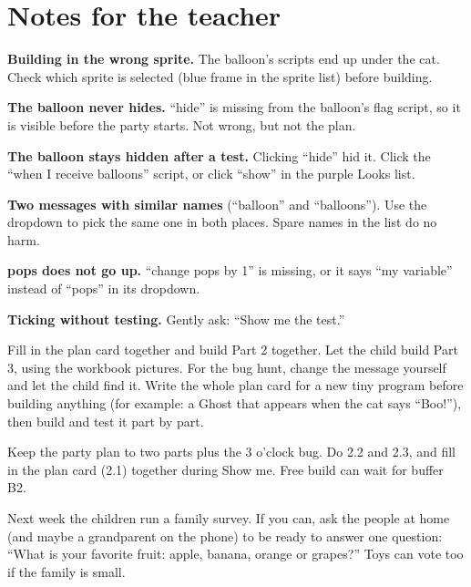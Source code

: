 \section{Notes for the teacher}
\begin{commonmistakes}
  \item \textbf{Building in the wrong sprite.} The balloon's scripts end up under the cat. Check which sprite is selected (blue frame in the sprite list) before building.
  \item \textbf{The balloon never hides.} \enquote{hide} is missing from the balloon's flag script, so it is visible before the party starts. Not wrong, but not the plan.
  \item \textbf{The balloon stays hidden after a test.} Clicking \enquote{hide} hid it. Click the \enquote{when I receive balloons} script, or click \enquote{show} in the purple Looks list.
  \item \textbf{Two messages with similar names} (\enquote{balloon} and \enquote{balloons}). Use the dropdown to pick the same one in both places. Spare names in the list do no harm.
  \item \textbf{pops does not go up.} \enquote{change pops by 1} is missing, or it says \enquote{my variable} instead of \enquote{pops} in its dropdown.
  \item \textbf{Ticking without testing.} Gently ask: \enquote{Show me the test.}
\end{commonmistakes}

\begin{differentiation}
\supportpath Fill in the plan card together and build Part 2 together. Let the child build Part 3, using the workbook pictures. For the bug hunt, change the message yourself and let the child find it.
\extensionpath Write the whole plan card for a new tiny program before building anything (for example: a Ghost that appears when the cat says \enquote{Boo!}), then build and test it part by part.
\end{differentiation}

\begin{teachernote}
Keep the party plan to two parts plus the 3 o'clock bug. Do 2.2 and 2.3, and fill in the plan card (2.1) together during Show me. Free build can wait for buffer B2.
\end{teachernote}

\begin{teachernote}
Next week the children run a family survey. If you can, ask the people at home (and maybe a grandparent on the phone) to be ready to answer one question: \enquote{What is your favorite fruit: apple, banana, orange or grapes?} Toys can vote too if the family is small.
\end{teachernote}
